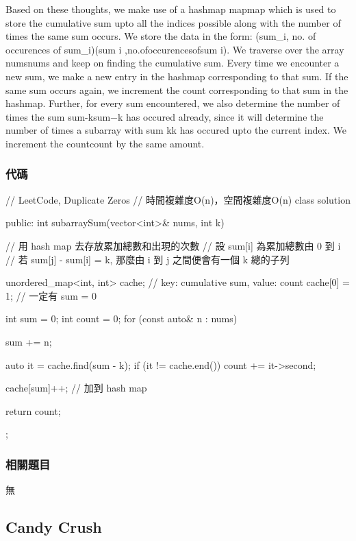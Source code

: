 Based on these thoughts, we make use of a hashmap mapmap which is used to store the cumulative sum upto all the indices possible along with the number of times the same sum occurs. We store the data in the form: (sum_i, no. of occurences of sum_i)(sum i ,no.ofoccurencesofsum i). We traverse over the array numsnums and keep on finding the cumulative sum. Every time we encounter a new sum, we make a new entry in the hashmap corresponding to that sum. If the same sum occurs again, we increment the count corresponding to that sum in the hashmap. Further, for every sum encountered, we also determine the number of times the sum sum-ksum−k has occured already, since it will determine the number of times a subarray with sum kk has occured upto the current index. We increment the countcount by the same amount.

\subsubsection{代碼}
\begin{Code}
// LeetCode, Duplicate Zeros
// 時間複雜度O(n)，空間複雜度O(n)
class solution{
public:
    int subarraySum(vector<int>& nums, int k) {
        // 用 hash map 去存放累加總數和出現的次數
        // 設 sum[i] 為累加總數由 0 到 i
        // 若 sum[j] - sum[i] = k, 那麼由 i 到 j 之間便會有一個 k 總的子列

        unordered_map<int, int> cache; // key: cumulative sum, value: count
        cache[0] = 1; // 一定有 sum = 0

        int sum = 0;
        int count = 0;
        for (const auto& n : nums)
        {
            sum += n;

            auto it = cache.find(sum - k);
            if (it != cache.end())
                count += it->second;

            cache[sum]++; // 加到 hash map
        }

        return count;
    }
};
\end{Code}

\subsubsection{相關題目}
\begindot
\item 無
\myenddot

\subsection{Candy Crush}
\label{sec:candy-crush}


